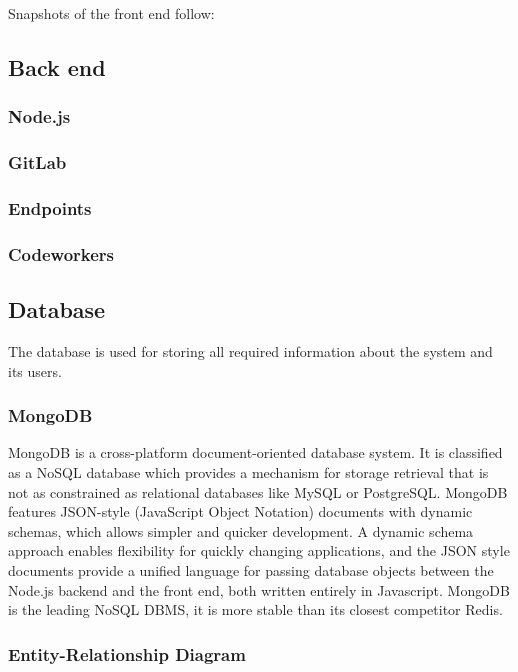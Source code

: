 Snapshots of the front end follow:

\subsection{Back end}
\subsubsection{Node.js}
\subsubsection{GitLab}
\subsubsection{Endpoints}
\subsubsection{Codeworkers}

\subsection{Database}

The database is used for storing all required information about the system and
its users.

\subsubsection{MongoDB}

MongoDB is a cross-platform document-oriented database system. It is classified
as a NoSQL database which provides a mechanism for storage retrieval that is not
as constrained as relational databases like MySQL or PostgreSQL. MongoDB
features JSON-style (JavaScript Object Notation) documents with dynamic schemas,
which allows simpler and quicker development. A dynamic schema approach enables
flexibility for quickly changing applications, and the JSON style documents
provide a unified language for passing database objects between the Node.js
backend and the front end, both written entirely in Javascript. MongoDB is the
leading NoSQL DBMS, it is more stable than its closest competitor Redis. 

\subsubsection{Entity-Relationship Diagram}

